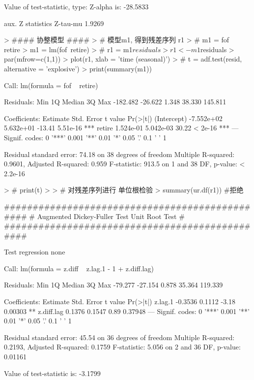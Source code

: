 \documentclass{article}
\begin{document}
\begin{Schunk}
\begin{Soutput}
Value of test-statistic, type: Z-alpha  is: -28.5833 

         aux. Z statistics
Z-tau-mu            1.9269
\end{Soutput}
\begin{Sinput}
> #### 协整模型 ####
> # 模型m1, 得到残差序列 r1
> # m1 = fof ~ retire
> m1 = lm(fof~retire)
> # r1 = m1$residuals
> r1 <- m1$residuals
> par(mfrow=c(1,1))
> plot(r1, xlab = 'time (seasonal)')
> # t = adf.test(resid, alternative = 'explosive')
> print(summary(m1))
\end{Sinput}
\begin{Soutput}
Call:
lm(formula = fof ~ retire)

Residuals:
     Min       1Q   Median       3Q      Max 
-182.482  -26.622    1.348   38.330  145.811 

Coefficients:
              Estimate Std. Error t value Pr(>|t|)    
(Intercept) -7.552e+02  5.632e+01  -13.41 5.51e-16 ***
retire       1.524e-01  5.042e-03   30.22  < 2e-16 ***
---
Signif. codes:  0 '***' 0.001 '**' 0.01 '*' 0.05 '.' 0.1 ' ' 1

Residual standard error: 74.18 on 38 degrees of freedom
Multiple R-squared:  0.9601,	Adjusted R-squared:  0.959 
F-statistic: 913.5 on 1 and 38 DF,  p-value: < 2.2e-16
\end{Soutput}
\begin{Sinput}
> # print(t)
> 
> # 对残差序列进行 单位根检验
> summary(ur.df(r1)) #拒绝
\end{Sinput}
\begin{Soutput}
############################################### 
# Augmented Dickey-Fuller Test Unit Root Test # 
############################################### 

Test regression none 


Call:
lm(formula = z.diff ~ z.lag.1 - 1 + z.diff.lag)

Residuals:
    Min      1Q  Median      3Q     Max 
-79.277 -27.154   0.878  35.364 119.339 

Coefficients:
           Estimate Std. Error t value Pr(>|t|)   
z.lag.1     -0.3536     0.1112   -3.18  0.00303 **
z.diff.lag   0.1376     0.1547    0.89  0.37948   
---
Signif. codes:  0 '***' 0.001 '**' 0.01 '*' 0.05 '.' 0.1 ' ' 1

Residual standard error: 45.54 on 36 degrees of freedom
Multiple R-squared:  0.2193,	Adjusted R-squared:  0.1759 
F-statistic: 5.056 on 2 and 36 DF,  p-value: 0.01161


Value of test-statistic is: -3.1799 


\end{Soutput}
\end{Schunk}
\end{document}
